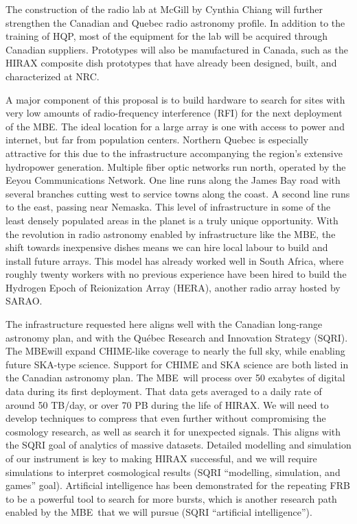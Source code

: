 \documentclass[letterpaper,11pt,preprint]{aastex}
\newcommand{\mbe}{{\rm MBE}}
\begin{document}
The construction of the radio lab at McGill by Cynthia Chiang will
further strengthen the Canadian and Quebec radio astronomy profile.
In addition to the training of HQP, most of the equipment for the lab
will be acquired through Canadian suppliers.  Prototypes will also be
manufactured in Canada, such as the HIRAX composite dish prototypes
that have already been designed, built, and characterized at NRC.  

A major component of this proposal is to build hardware to search for
sites with very low amounts of radio-frequency interference (RFI) for
the next deployment of the \mbe.  The ideal location for a large array
is one with access to power and internet, but far from population
centers.  Northern Quebec is especially attractive for this due to the
infrastructure accompanying the region's extensive hydropower
generation.  Multiple fiber optic networks run north, operated by the
Eeyou Communications Network.  One line runs along the James Bay road
with several branches cutting west to service towns along the coast.
A second line runs to the east, passing near Nemaska.  This level of
infrastructure in some of the least densely populated areas in the
planet is a truly unique opportunity.  With the revolution in radio
astronomy enabled by infrastructure like the \mbe, the shift towards
inexpensive dishes means we can hire local labour to build and install
future arrays.  This model has already worked well in South Africa,
where roughly twenty workers with no previous experience have been
hired to build the Hydrogen Epoch of Reionization Array (HERA),
another radio array hosted by SARAO.  

The infrastructure requested here aligns well with the Canadian
long-range astronomy plan, and with the Qu\'ebec Research and Innovation
Strategy (SQRI).  The \mbe will expand CHIME-like coverage to nearly the full
sky, while enabling future SKA-type science.  Support for CHIME and
SKA science are both listed in the Canadian astronomy plan.  The
\mbe\ will process over 50 exabytes of digital data during its first
deployment.  That data gets averaged to a daily rate of around 50
TB/day, or over 70 PB during the life of HIRAX. We will need to
develop techniques to compress that even further without compromising
the cosmology research, as well as search it for unexpected signals.
This aligns with the SQRI goal of analytics of massive datasets.
Detailed modelling and simulation of our instrument is key to making
HIRAX successful, and we will require simulations to interpret
cosmological results (SQRI ``modelling, simulation, and games''
goal).  Artificial intelligence has been demonstrated for the
repeating FRB to be a powerful tool to search for more bursts, which
is another research path enabled by the \mbe\ that we will pursue
(SQRI ``artificial intelligence'').  
\end{document}
